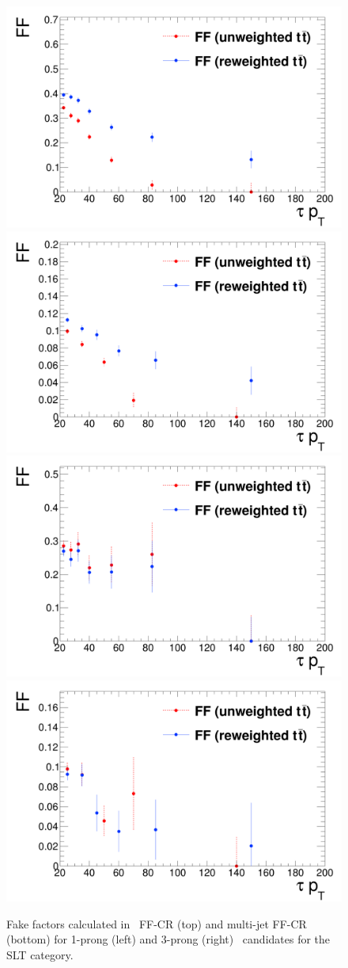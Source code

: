 \begin{figure}[htbp]
\centering
\includegraphics[width=.48\textwidth]{DiHiggs/plots/FF_CRs/SLTttbarCR1p.png}
\includegraphics[width=.48\textwidth]{DiHiggs/plots/FF_CRs/SLTttbarCR3p.png} \\
\includegraphics[width=.48\textwidth]{DiHiggs/plots/FF_CRs/SLTInvCR1p.png}
\includegraphics[width=.48\textwidth]{DiHiggs/plots/FF_CRs/SLTInvCR3p.png}\\
\caption{Fake factors 
calculated in \ttbar\ FF-CR (top) and multi-jet FF-CR (bottom)
for 1-prong (left) and 3-prong (right) 
\tauhad\ candidates for the SLT category.}
\label{fig:SLT_FF}
\end{figure}

